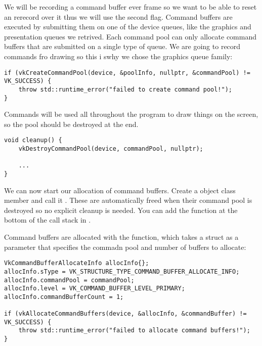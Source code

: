 \par We will be recording a command buffer ever frame so we want to be able to reset an rerecord over it thus we will use the second flag. Command buffers are executed by submitting them on one of the device queues, like the graphics and presentation queues we retrived. Each command pool can only allocate command buffers that are submitted on a single type of queue. We are going to record commands fro drawing so this i swhy we chose the graphics queue family:

\begin{center}
\begin{minipage}{0.95\linewidth}
\begin{lstlisting}
if (vkCreateCommandPool(device, &poolInfo, nullptr, &commandPool) != VK_SUCCESS) {
    throw std::runtime_error("failed to create command pool!");
}
\end{lstlisting}
\end{minipage}
\end{center}

\par Commands will be used all throughout the program to draw things on the screen, so the pool should be destroyed at the end.

\begin{center}
\begin{minipage}{0.95\linewidth}
\begin{lstlisting}
void cleanup() {
    vkDestroyCommandPool(device, commandPool, nullptr);

    ...
}
\end{lstlisting}
\end{minipage}
\end{center}

\par We can now start our allocation of command buffers. Create a  object class member and call it . These are automatically freed when their command pool is destroyed so no explicit cleanup is needed. You can add the function at the bottom of the call stack in .

\par Command buffers are allocated with the  function, which takes a  struct as a parameter that specifies the commadn pool and number of buffers to allocate:

\begin{center}
\begin{minipage}{0.95\linewidth}
\begin{lstlisting}
VkCommandBufferAllocateInfo allocInfo{};
allocInfo.sType = VK_STRUCTURE_TYPE_COMMAND_BUFFER_ALLOCATE_INFO;
allocInfo.commandPool = commandPool;
allocInfo.level = VK_COMMAND_BUFFER_LEVEL_PRIMARY;
allocInfo.commandBufferCount = 1;

if (vkAllocateCommandBuffers(device, &allocInfo, &commandBuffer) != VK_SUCCESS) {
    throw std::runtime_error("failed to allocate command buffers!");
}
\end{lstlisting}
\end{minipage}
\end{center}

